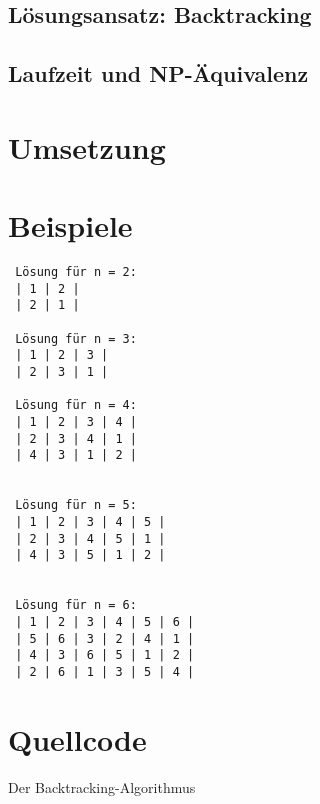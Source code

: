 \documentclass[a4paper, notitlepage, 12pt]{scrartcl}
\newenvironment{longlisting}{\captionsetup{type=listing}}{}
\begin{document}
\subsection{Lösungsansatz: Backtracking}
\subsection{Laufzeit und NP-Äquivalenz}
 \section{Umsetzung}
 \section{Beispiele}
 \begin{multicols}{2}
 \begin{verbatim}
 Lösung für n = 2: 
 | 1 | 2 | 
 | 2 | 1 |
 
 Lösung für n = 3:
 | 1 | 2 | 3 | 
 | 2 | 3 | 1 |
 
 Lösung für n = 4: 
 | 1 | 2 | 3 | 4 | 
 | 2 | 3 | 4 | 1 | 
 | 4 | 3 | 1 | 2 |
 
 
 Lösung für n = 5: 
 | 1 | 2 | 3 | 4 | 5 | 
 | 2 | 3 | 4 | 5 | 1 | 
 | 4 | 3 | 5 | 1 | 2 |
 
 
 Lösung für n = 6: 
 | 1 | 2 | 3 | 4 | 5 | 6 | 
 | 5 | 6 | 3 | 2 | 4 | 1 | 
 | 4 | 3 | 6 | 5 | 1 | 2 | 
 | 2 | 6 | 1 | 3 | 5 | 4 |    
 \end{verbatim}
 \end{multicols}
 \section{Quellcode}
 \renewcommand{\listingscaption}{Quellcode}
 
 \begin{longlisting}
 \caption{Der Backtracking-Algorithmus}
 \end{longlisting}
 
 
\end{document}
